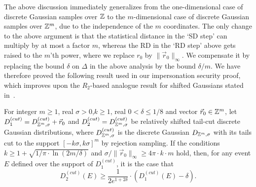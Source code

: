 The above discussion immediately generalizes from the one-dimensional case of
discrete Gaussian samples over $\mathbb{Z}$ to the $m$-dimensional case of discrete
Gaussian samples over $\mathbb{Z}^m$, due to the independence of the $m$
coordinates. The only change to the above argument is that the statistical
distance in the `SD step' can multiply by at most a factor $m$, whereas the RD
in the `RD step' above gets raised to the $m$'th power, where we replace $r_0$
by $\|\vec{r}_0\|_{\infty}$. We compensate it by replacing the bound
$\delta$ on $\Delta$ in the above analysis by the bound $\delta/m$. We have
therefore proved the following result used in our impersonation security proof,
which improves upon the $R_2$-based analogue result for shifted Gaussians stated
in~\cite{langlois2014gghlite}.


\begin{lemma} \label{le:Renyi} For integer $m \geq 1$, real
  $\sigma>0$,$k \geq 1$, real $0<\delta \leq 1/8$ and vector
  $\vec{r}_0 \in \mathbb{Z}^m$, let
  $D_1^{(cut)} = D_{\mathbb{Z}^m,\sigma}^{(cut)} + \vec{r}_0$ and
  $D_2^{(cut)} = D_{\mathbb{Z}^m,\sigma}^{(cut)}$ be relatively shifted tail-cut
  discrete Gaussian distributions, where $D_{\mathbb{Z}^m,\sigma}^{(cut)}$ is the
  discrete Gaussian $D_{\mathbb{Z}^m,\sigma}$ with its tails cut to the support
  $[-k\sigma,k\sigma]^m$ by rejection sampling. If the conditions
  $k \geq 1 + \sqrt{1/\pi \cdot \ln(2m/\delta)}$ and
  $\sigma/\|\vec{r}_0\|_{\infty} \geq 4 \pi \cdot k \cdot m$ hold, then, for any
  event $E$ defined over the support of $D_1^{(cut)}$, it is the case that
$$
D_2^{(cut)}(E) \geq \frac{1}{2e^{1+2\delta}} \cdot \left(D_1^{(cut)}(E) - \delta\right).
$$
\end{lemma}

